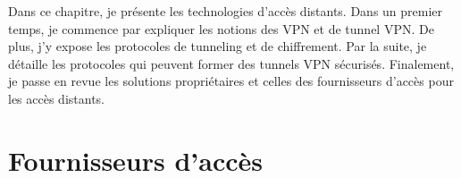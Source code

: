 Dans ce chapitre, je présente les technologies d'accès distants.
Dans un premier temps, je commence par expliquer les notions des VPN et de tunnel VPN. 
De plus, j'y expose les protocoles de tunneling et de chiffrement.
Par la suite, je détaille les protocoles qui peuvent former des tunnels VPN sécurisés. 
Finalement, je passe en revue les solutions propriétaires et celles des fournisseurs d'accès pour les accès distants.










\section{Fournisseurs d'accès}
